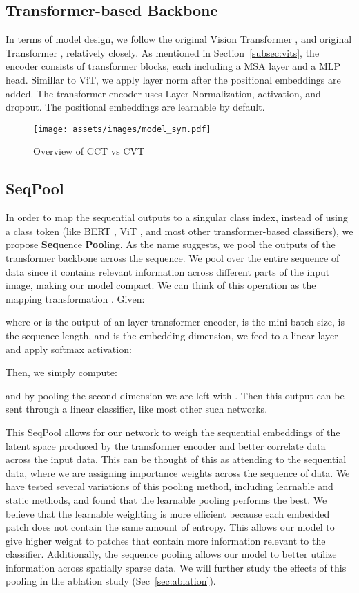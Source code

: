 \documentclass[10pt,twocolumn,letterpaper]{article}
\begin{document}
\subsection{Transformer-based Backbone}
In terms of model design, we follow the original Vision Transformer \cite{dosovitskiy2020image}, and original Transformer \cite{vaswani2017attention}, relatively closely.
As mentioned in Section~\ref{subsec:vits}, the encoder consists of transformer blocks, each including a MSA layer and a MLP head. 
Simillar to ViT, we apply layer norm after the positional embeddings are added. The transformer encoder uses Layer Normalization,  activation, and dropout. The positional embeddings are learnable by default.

\begin{figure*}[ht!]
    \centering
    \texttt{[image: assets/images/model\_sym.pdf]}
    \caption{Overview of CCT vs CVT}
    \label{fig:cct_vs_cvt}
\end{figure*}
\subsection{SeqPool}
\label{sec:seqpool}
In order to map the sequential outputs to a singular class index, instead of using a class token (like BERT \cite{devlin2019bert}, ViT \cite{dosovitskiy2020image}, and most other transformer-based classifiers), we propose \textbf{Seq}uence \textbf{Pool}ing. As the name suggests, we pool the outputs of the transformer backbone across the sequence. 
We pool over the entire sequence of data since it contains relevant information across different parts of the input image, making our model compact. 
We can think of this operation as the mapping transformation . Given:

where  or  is the output of an  layer transformer encoder,  is the mini-batch size,  is the sequence length, and  is the embedding dimension, we feed  to a linear layer  and apply softmax activation:

Then, we simply compute:

and by pooling the second dimension we are left with . Then this output can be sent through a linear classifier, like most other such networks. 

This SeqPool allows for our network to weigh the sequential embeddings of the latent space produced by the transformer encoder and better correlate data across the input data. 
This can be thought of this as attending to the sequential data, where we are assigning importance weights across the sequence of data. 
We have tested several variations of this pooling method, including learnable and static methods, and found that the learnable pooling performs the best. 
We believe that the learnable weighting is more efficient because each embedded patch does not contain the same amount of entropy.
This allows our model to give higher weight to patches that contain more information relevant to the classifier.
Additionally, the sequence pooling allows our model to better utilize information across spatially sparse data. 
We will further study the effects of this pooling in the ablation study (Sec~\ref{sec:ablation}).
\end{document}
